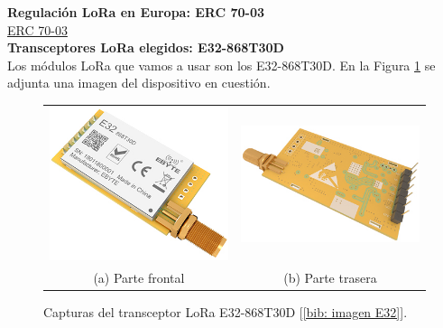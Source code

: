 \documentclass[12pt]{article}
\begin{document}
	 
	
	\noindent  \textbf{Regulación LoRa en Europa: ERC 70-03} \\
	
	\noindent \href{https://docdb.cept.org/download/25c41779-cd6e/Rec7003e.pdf}{ERC 70-03} \\

	\noindent \textbf{Transceptores LoRa elegidos: E32-868T30D} \\
	
	\noindent Los módulos LoRa que vamos a usar son los E32-868T30D. En la Figura \ref{fig: capturas E32.} se adjunta una imagen del dispositivo en cuestión. \\
	
	\begin{figure}[h]
		\begin{center}
			\begin{tabular}{cc}
				\includegraphics[width=60mm]{img/e32_front.png} &   \includegraphics[width=60mm]{img/e32_rear.png} \\
				(a) Parte frontal & (b) Parte trasera\\[6pt]
			\end{tabular}
			\caption{Capturas del transceptor LoRa E32-868T30D [\ref{bib: imagen E32}].}
			\label{fig: capturas E32.}
		\end{center}
	\end{figure}	
	
\end{document}
